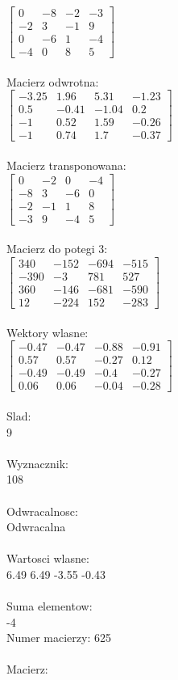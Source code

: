 \documentclass[a4paper,12pt]{article}
\begin{document}
$\begin{bmatrix} 0&-8&-2&-3\\-2&3&-1&9\\0&-6&1&-4\\-4&0&8&5 \end{bmatrix}$
\\
\\
Macierz odwrotna:\\

$\begin{bmatrix} -3.25&1.96&5.31&-1.23\\0.5&-0.41&-1.04&0.2\\-1&0.52&1.59&-0.26\\-1&0.74&1.7&-0.37 \end{bmatrix}$
\\
\\
Macierz transponowana:\\

$\begin{bmatrix} 0&-2&0&-4\\-8&3&-6&0\\-2&-1&1&8\\-3&9&-4&5 \end{bmatrix}$
\\
\\
Macierz do potegi 3:\\

$\begin{bmatrix} 340&-152&-694&-515\\-390&-3&781&527\\360&-146&-681&-590\\12&-224&152&-283 \end{bmatrix}$
\\
\\
Wektory wlasne:\\

$\begin{bmatrix} -0.47&-0.47&-0.88&-0.91\\0.57&0.57&-0.27&0.12\\-0.49&-0.49&-0.4&-0.27\\0.06&0.06&-0.04&-0.28 \end{bmatrix}$
\\
\\
Slad:\\
9
\\
\\
Wyznacznik:\\
108
\\
\\
Odwracalnosc:\\
Odwracalna
\\
\\
Wartosci wlasne:\\
6.49 6.49 -3.55 -0.43
\\
\\
Suma elementow:\\
-4
\\
\newpage
Numer macierzy:
625
\\
\\
Macierz:\\
\end{document}
